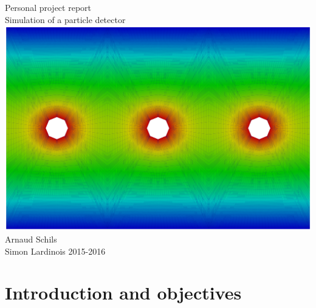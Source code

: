 \documentclass[11pt]{article}
\date{2015-2016}
\begin{document}

	\begin{titlepage}
    \centering
    \vfill
    { \Huge{Personal project report \\ Simulation of a particle detector}
		  \vfill
			\vfill
			\vfill
      \includegraphics[scale=0.055]{images/grid_refinement/garde.png}
			\vfill
			\vfill
			\Large{Arnaud Schils\\ Simon Lardinois}
			\vfill
			\Large{2015-2016}
    }

\end{titlepage}




\newpage


\renewcommand\cftsecleader{\cftdotfill{\cftdotsep}}
\renewcommand{\contentsname}{Table of contents}
\tableofcontents


\newpage
\section*{Introduction and objectives}
\end{document}
